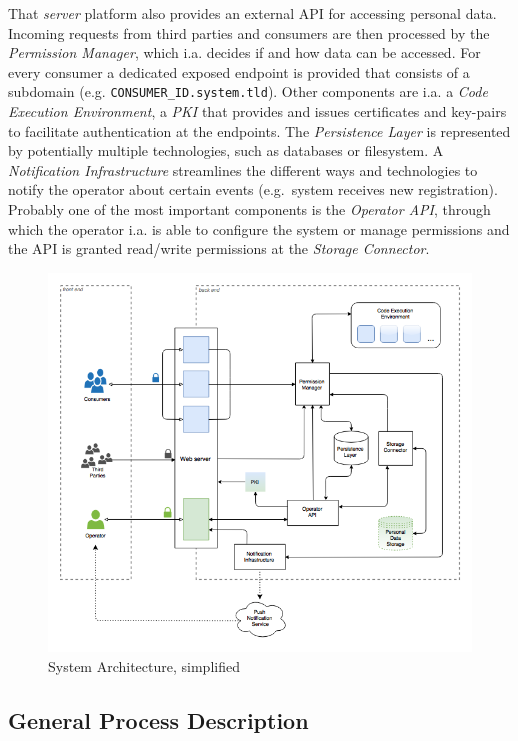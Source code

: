 \documentclass[12pt,english,a4paper,titlepage,cleardoublepage=empty,dottedtoc]{report}
\begin{document}
That \emph{server} platform also provides an external API for accessing
personal data. Incoming requests from third parties and consumers are
then processed by the \emph{Permission Manager}, which i.a. decides if
and how data can be accessed. For every consumer a dedicated exposed
endpoint is provided that consists of a subdomain (e.g.
\texttt{CONSUMER\_ID.system.tld}). Other components are i.a. a
\emph{Code Execution Environment}, a \emph{PKI} that provides and issues
certificates and key-pairs to facilitate authentication at the
endpoints. The \emph{Persistence Layer} is represented by potentially
multiple technologies, such as databases or filesystem. A
\emph{Notification Infrastructure} streamlines the different ways and
technologies to notify the operator about certain events (e.g.~system
receives new registration). Probably one of the most important
components is the \emph{Operator API}, through which the operator i.a.
is able to configure the system or manage permissions and the API is
granted read/write permissions at the \emph{Storage Connector}.

\begin{figure}
\centering
\includegraphics[width=12.00000cm]{./assets/figures/spec_arch_simplifierd.png}
\caption{System Architecture,
simplified\label{fig:spec_arch_simplifier}}
\end{figure}

\subsection{General Process
Description}\label{general-process-description}
\end{document}
